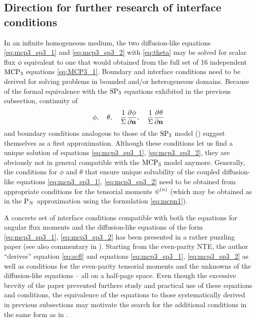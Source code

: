 \subsection{Direction for further research of interface conditions}\label{sec:mcp3_discussion}
In an infinite homogeneous medium, the two diffusion-like equations \eqref{eq:mcp3_sp3_1} and
\eqref{eq:mcp3_sp3_2} with \eqref{eq:theta} may be solved for scalar flux $\phi$ equivalent to one that would obtained from the full set
of 16 independent $\MCPN[3]$ equations \eqref{eq:MCP3_1}. Boundary and interface conditions need to be derived for
solving problems in bounded and/or heterogeneous domains. Because of the formal equivalence with the $\SPN[3]$
equations exhibited in the previous subsection, continuity of
$$
	\phi,\quad \theta,\quad \frac{1}{\Sigma}\pd{\phi}{\bn},\quad \frac{1}{\Sigma}\pd{\theta}{\bn}
$$
and boundary conditions analogous to those of the $\SPN[3]$ model () suggest themselves as a first
approximation. Although these conditions let us find a unique solution of equations \eqref{eq:mcp3_sp3_1},
\eqref{eq:mcp3_sp3_2}, they are obviously not in general compatible with the $\MCPN[3]$ model anymore. Generally, the
conditions for $\phi$ and $\theta$ that ensure unique solvability of the coupled diffusion-like equations
\eqref{eq:mcp3_sp3_1}, \eqref{eq:mcp3_sp3_2} need to be obtained from appropriate conditions for the tensorial moments
$\fmom[n]$ (which may be obtained as in the $\PN$ approximation using the formulation \eqref{eq:mcpn1}).

A concrete set of interface conditions compatible with both the equations for angular flux moments and the
diffusion-like equations of the form \eqref{eq:mcp3_sp3_1}, \eqref{eq:mcp3_sp3_2} has been presented in a rather
puzzling paper \cite{Selengut} (see also commentary in \cite[Sec. 5.2]{McClarren2}). Starting from the even-parity NTE,
the author ``derives'' equation \eqref{eq:scfl} and equations \eqref{eq:mcp3_sp3_1}, \eqref{eq:mcp3_sp3_2} as well as
conditions for the even-parity tensorial moments and the unknowns of the diffusion-like equations -- all on a half-page
space. Even though the excessive brevity of the paper prevented furthere study and practical use of these equations and
conditions, the equivalence of the equations to those systematically derived in previous subsections may motivate the
search for the additional conditions in the same form as in \cite{Selengut}.


